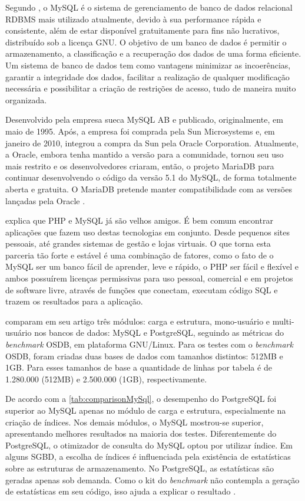 Segundo , o MySQL é o sistema de gerenciamento de banco de dados relacional RDBMS mais utilizado atualmente, devido à sua performance rápida e consistente, além de estar disponível gratuitamente para fins não lucrativos, distribuído sob a licença GNU. O objetivo de um banco de dados é permitir o armazenamento, a classificação e a recuperação dos dados de uma forma eficiente. Um sistema de banco de dados tem como vantagens minimizar as incoerências, garantir a integridade dos dados, facilitar a realização de qualquer modificação necessária e possibilitar a criação de restrições de acesso, tudo de maneira muito organizada.

\newpage
Desenvolvido pela empresa sueca MySQL AB e publicado, originalmente, em maio de 1995. Após, a empresa foi comprada pela Sun Microsystems e, em janeiro de 2010, integrou a compra da Sun pela Oracle Corporation. Atualmente, a Oracle, embora tenha mantido a versão para a comunidade, tornou seu uso mais restrito e os desenvolvedores criaram, então, o projeto MariaDB para continuar desenvolvendo o código da versão 5.1 do MySQL, de forma totalmente aberta e gratuita. O MariaDB pretende manter compatibilidade com as versões lançadas pela Oracle \cite{mariadb}.

 explica que PHP e MySQL já são velhos amigos. É bem comum encontrar aplicações que fazem uso destas tecnologias em conjunto. Desde pequenos sites pessoais, até grandes sistemas de gestão e lojas virtuais. O que torna esta parceria tão forte e estável é uma combinação de fatores, como o fato de o MySQL ser um banco fácil de aprender, leve e rápido, o PHP ser fácil e flexível e ambos possuírem licenças permissivas para uso pessoal, comercial e em projetos de software livre, através de funções que conectam, executam código SQL e trazem os resultados para a aplicação.

 comparam em seu artigo três módulos: carga e estrutura, mono-usuário e multi-usuário nos bancos de dados: MySQL e PostgreSQL, seguindo as métricas do \textit{benchmark} OSDB, em plataforma GNU/Linux. Para os testes com o \textit{benchmark} OSDB, foram criadas duas bases de dados com tamanhos distintos: 512MB e 1GB. Para esses tamanhos de base a quantidade de linhas por tabela é de 1.280.000 (512MB) e 2.500.000 (1GB), respectivamente.

De acordo com a \autoref{tab:comparisonMySql}, o desempenho do PostgreSQL foi superior ao MySQL apenas no módulo de carga e estrutura, especialmente na criação de índices. Nos demais módulos, o MySQL mostrou-se superior, apresentando melhores resultados na maioria dos testes. Diferentemente do PostgreSQL, o otimizador de consulta do MySQL optou por utilizar índice. Em alguns SGBD, a escolha de índices é influenciada pela existência de estatísticas sobre as estruturas de armazenamento. No PostgreSQL, as estatísticas são geradas apenas sob demanda. Como o kit do \textit{benchmark} não contempla a geração de estatísticas em seu código, isso ajuda a explicar o resultado \cite{mysql:ufpe}.


